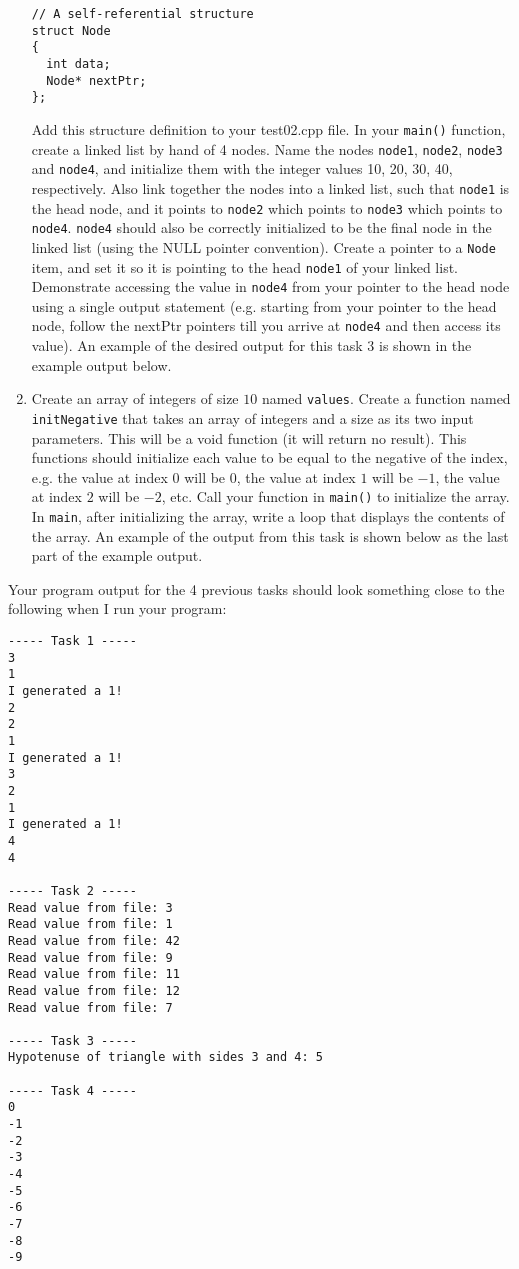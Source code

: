 \documentclass[11pt]{article}
\begin{document}
\begin{enumerate}
\begin{verbatim}
// A self-referential structure
struct Node
{
  int data;
  Node* nextPtr;
};
\end{verbatim}
   Add this structure definition to your test02.cpp file.  In your
   \verb~main()~ function, create a linked list by hand of 4 nodes.  Name
   the nodes \verb~node1~, \verb~node2~, \verb~node3~ and \verb~node4~, and initialize
   them with the integer values 10, 20, 30, 40, respectively.  Also
   link together the nodes into a linked list, such that \verb~node1~ is
   the head node, and it points to \verb~node2~ which points to \verb~node3~
   which points to \verb~node4~.  \verb~node4~ should also be correctly
   initialized to be the final node in the linked list (using the NULL
   pointer convention).  Create a pointer to a \verb~Node~ item, and set it
   so it is pointing to the head \verb~node1~ of your linked list.  Demonstrate
   accessing the value in \verb~node4~ from your pointer to the head node using
   a single output statement (e.g. starting from your pointer to the head
   node, follow the nextPtr pointers till you arrive at \verb~node4~ and then
   access its value).  An example of the desired output for this task
   3 is shown in the example output below.
\item Create an array of integers of size $10$ named \verb~values~.  Create a
   function named \verb~initNegative~ that takes an array of integers and a
   size as its two input parameters.  This will be a void function (it
   will return no result).  This functions should initialize each
   value to be equal to the negative of the index, e.g. the value at
   index $0$ will be $0$, the value at index $1$ will be $-1$, the
   value at index $2$ will be $-2$, etc.  Call your function in
   \verb~main()~ to initialize the array.  In \verb~main~, after initializing
   the array, write a loop that displays the contents of the array.
   An example of the output from this task is shown below as the last
   part of the example output.
\end{enumerate}

Your program output for the 4 previous tasks should look something
close to the following when I run your program:


\begin{verbatim}
----- Task 1 -----
3
1
I generated a 1!
2
2
1
I generated a 1!
3
2
1
I generated a 1!
4
4

----- Task 2 -----
Read value from file: 3
Read value from file: 1
Read value from file: 42
Read value from file: 9
Read value from file: 11
Read value from file: 12
Read value from file: 7

----- Task 3 -----
Hypotenuse of triangle with sides 3 and 4: 5

----- Task 4 -----
0
-1
-2
-3
-4
-5
-6
-7
-8
-9
\end{verbatim}
\end{document}
